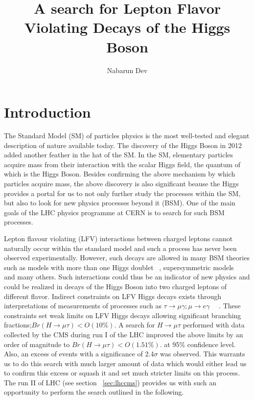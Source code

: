 \documentclass[a4paper,11pt]{article}
\title{\boldmath A search for Lepton Flavor Violating Decays of the Higgs Boson }
\author[a]{Nabarun Dev}
\affiliation[a]{Department of physics, University of Notre Dame, Indiana, USA}
\begin{document}
\linenumbers

\maketitle
\flushbottom

\section{Introduction}
\label{sec:intro}
The Standard Model (SM) of particles physics is the most well-tested and elegant description of nature available today. 
The discovery of the Higgs Boson in 2012 ~\cite{a} added another feather in the hat of the SM.
In the SM, elementary particles acquire mass from their interaction with the scalar Higgs field, the quantum of which is the  Higgs Boson.
Besides confirming the above mechanism by which particles acquire mass, the above discovery is also significant beause the Higgs provides a portal for us to not only further study the processes within the SM, but also to look for new physics processes beyond it (BSM). 
One of the main goals of the LHC  physics programme at CERN is to search for such BSM processes.


Lepton flavour violating (LFV) interactions between charged leptons cannot naturally occur within the standard model and such a process has never been observed experimentally.
However, such decays are allowed in many BSM theories such as models with more than one Higgs doublet ~\cite{b}, supersymmetric models ~\cite{c} and many others. 
Such interactions could thus be an indicator of new physics and could be realized in decays of the Higgs Boson into two charged leptons of different flavor.
Indirect constraints on LFV Higgs decays exists through interpretations of measurements of processes such as $\tau \rightarrow \mu \gamma ; \mu \rightarrow e \gamma$ ~\cite{d}~\cite{e}. 
These constraints set weak limits on LFV Higgs decays allowing significant branching fractions;$Br(H\rightarrow \mu \tau)<O(10\%).$
 A search for $H\rightarrow \mu \tau$ performed with data collected by the CMS during run I of the LHC  improved the above limits by an order of magnitude to $Br(H\rightarrow \mu \tau)<O(1.51\%).$ at 95\% confidence level. Also, an excess of events with a significance of 2.4$\sigma$ was observed. This warrants us to do this search with much larger amount of data which would either lead us to confirm this excess or squash it and set much stricter limits on this process. The run II of LHC (see section ~\ref{sec:lhccms})  provides us with such an opportunity to perform the search outlined in the following.   
\end{document}
